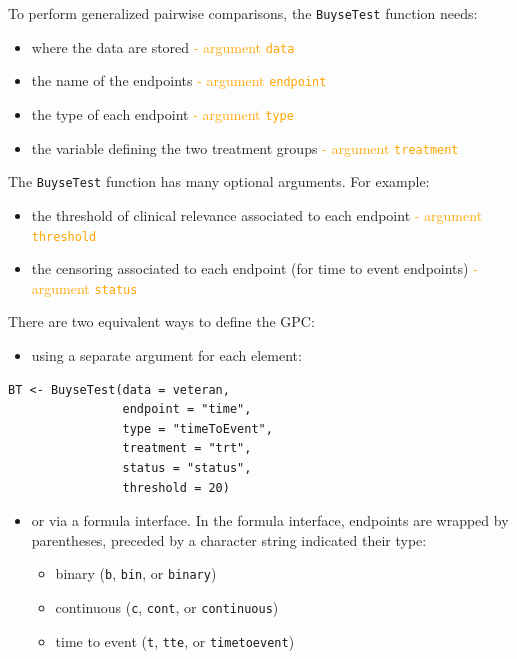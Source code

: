 \documentclass[12pt]{article}
\begin{document}
To perform generalized pairwise comparisons, the \texttt{BuyseTest} function needs:
\begin{itemize}
\item where the data are stored \hfill \textcolor{orange}{- argument \texttt{data}}
\item the name of the endpoints \hfill \textcolor{orange}{- argument \texttt{endpoint}}
\item the type of each endpoint \hfill \textcolor{orange}{- argument \texttt{type}}
\item the variable defining the two treatment groups \hfill
\textcolor{orange}{- argument \texttt{treatment}}
\end{itemize}
The \texttt{BuyseTest} function has many optional arguments. For example:
\begin{itemize}
\item the threshold of clinical relevance associated to each endpoint \hfill \textcolor{orange}{- argument \texttt{threshold}}
\item the censoring associated to each endpoint (for time to event endpoints) \hfill \textcolor{orange}{- argument \texttt{status}}
\end{itemize}

\bigskip

There are two equivalent ways to define the GPC: 
\begin{itemize}
\item using a separate argument for each element:
\end{itemize}

\lstset{language=r,label= ,caption= ,captionpos=b,numbers=none}
\begin{lstlisting}
BT <- BuyseTest(data = veteran, 
                endpoint = "time", 
                type = "timeToEvent", 
                treatment = "trt", 
                status = "status", 
                threshold = 20)
\end{lstlisting}

\clearpage

\begin{itemize}
\item or via a formula interface. In the formula interface, endpoints are
wrapped by parentheses, preceded by a character string indicated
their type:
\begin{itemize}[label={-}]
\item binary (\texttt{b}, \texttt{bin}, or \texttt{binary})
\item continuous (\texttt{c}, \texttt{cont}, or  \texttt{continuous})
\item time to event (\texttt{t}, \texttt{tte}, or \texttt{timetoevent})
\end{itemize}
\end{itemize}
\end{document}

